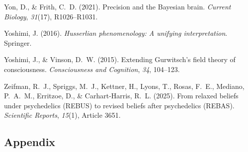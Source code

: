 \documentclass[12pt,fleqn]{article}
\begin{document}
\begin{thebibliography}{}
  Yon, D., \& Frith, C.~D. (2021).
  Precision and the Bayesian brain.
  \emph{Current Biology}, \emph{31}(17), R1026--R1031.

  Yoshimi, J. (2016).
  \emph{Husserlian phenomenology: A unifying interpretation}.
  Springer.

  Yoshimi, J., \& Vinson, D.~W. (2015).
  Extending Gurwitsch's field theory of consciousness.
  \emph{Consciousness and Cognition}, \emph{34}, 104--123.

  Zeifman, R.~J., Spriggs, M.~J., Kettner, H., Lyons, T., Rosas, F.~E., Mediano, P.~A.~M., Erritzoe, D., \& Carhart-Harris, R.~L. (2025).
  From relaxed beliefs under psychedelics (REBUS) to revised beliefs after psychedelics (REBAS).
  \emph{Scientific Reports}, \emph{15}(1), Article 3651.

\end{thebibliography}


\clearpage
\begin{appendices}

  \section{Appendix}\label{appendix}

  





\end{appendices}
\end{document}
